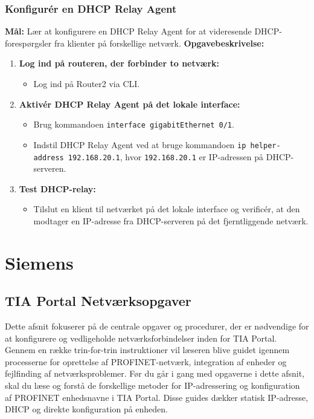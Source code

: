 \subsection{Konfigurér en DHCP Relay Agent}
\textbf{Mål:} Lær at konfigurere en DHCP Relay Agent for at videresende DHCP-forespørgsler fra klienter på forskellige netværk.
\newline\newline\noindent
\textbf{Opgavebeskrivelse:}
\begin{enumerate}
	\item \textbf{Log ind på routeren, der forbinder to netværk:}
	\begin{itemize}
		\item Log ind på Router2 via CLI.
	\end{itemize}
	\item \textbf{Aktivér DHCP Relay Agent på det lokale interface:}
	\begin{itemize}
		\item Brug kommandoen \texttt{interface gigabitEthernet 0/1}.
		\item Indstil DHCP Relay Agent ved at bruge kommandoen \texttt{ip helper-address 192.168.20.1}, hvor \texttt{192.168.20.1} er IP-adressen på DHCP-serveren.
	\end{itemize}
	\item \textbf{Test DHCP-relay:}
	\begin{itemize}
		\item Tilslut en klient til netværket på det lokale interface og verificér, at den modtager en IP-adresse fra DHCP-serveren på det fjerntliggende netværk.
	\end{itemize}
\end{enumerate}


\chapter{Siemens}
\section{TIA Portal Netværksopgaver}
\label{sec:tia_portal_opgaver}
Dette afsnit fokuserer på de centrale opgaver og procedurer, der er nødvendige for at konfigurere og vedligeholde netværksforbindelser inden for TIA Portal. Gennem en række trin-for-trin instruktioner vil læseren blive guidet igennem processerne for oprettelse af PROFINET-netværk, integration af enheder og fejlfinding af netværksproblemer.
\newline\newline\noindent
Før du går i gang med opgaverne i dette afsnit, skal du læse og forstå de forskellige metoder for IP-adressering og konfiguration af PROFINET enhedsnavne i TIA Portal. Disse guides dækker statisk IP-adresse, DHCP og direkte konfiguration på enheden.

